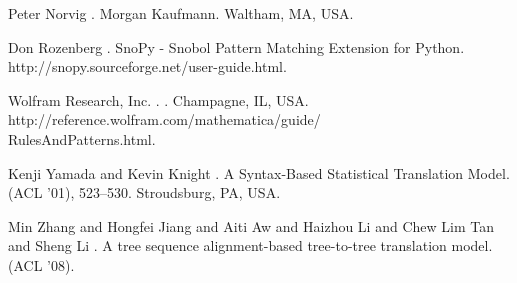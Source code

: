 \documentclass[a4,11pt]{article}
\begin{document}
\begin{thebibliography}{}
Peter Norvig
.
\newblock Morgan Kaufmann.
\newblock Waltham, MA, USA.

Don Rozenberg
.
\newblock SnoPy - Snobol Pattern Matching Extension for Python.
\newblock http://snopy.sourceforge.net/user-guide.html.


Wolfram Research, Inc.
.
.
\newblock Champagne, IL, USA.
\newblock http://reference.wolfram.com/mathematica/guide/\\RulesAndPatterns.html.

Kenji Yamada and Kevin Knight
.
\newblock A Syntax-Based Statistical Translation Model.
 (ACL '01), 523--530.
\newblock Stroudsburg, PA, USA.


Min Zhang and Hongfei Jiang and Aiti Aw and Haizhou Li and Chew Lim Tan and Sheng Li
.
\newblock A tree sequence alignment-based tree-to-tree translation model.
 (ACL '08).


\end{thebibliography}
\end{document}
